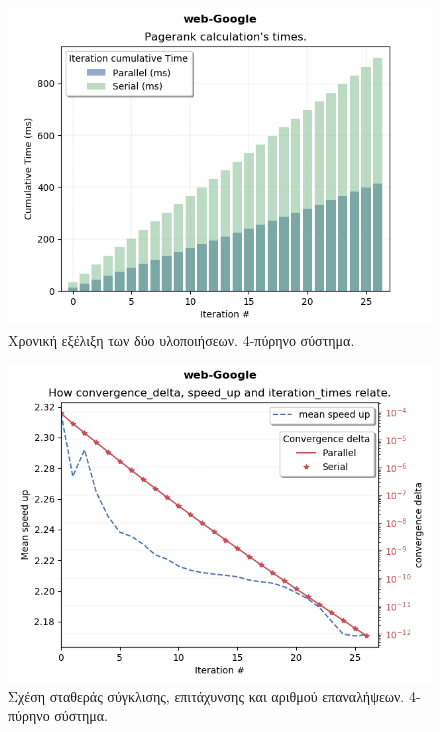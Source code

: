 \begin{center}
\begin{figure}
\includegraphics[width=\linewidth]{plots/it_time.png}
\caption{Χρονική εξέλιξη των δύο υλοποιήσεων. 4-πύρηνο σύστημα.}
\end{figure}

\begin{figure}
\includegraphics[width=\linewidth]{plots/speed_up.png}
\caption{Σχέση σταθεράς σύγκλισης, επιτάχυνσης και αριθμού επαναλήψεων. 4-πύρηνο σύστημα.}
\end{figure}


\end{center}

